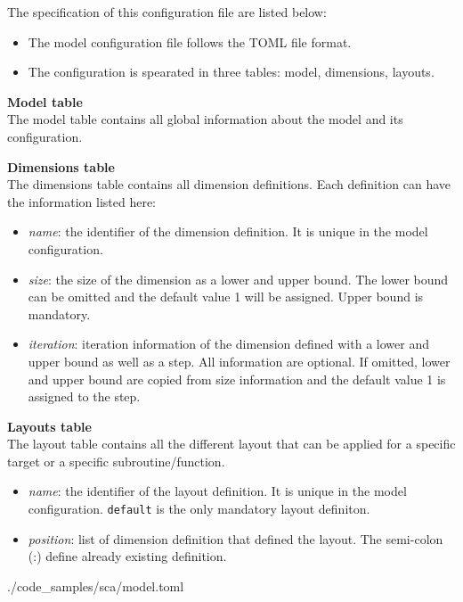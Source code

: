 The specification of this configuration file are listed below:
\begin{itemize}
  \item The model configuration file follows the TOML file format. 
  \item The configuration is spearated in three tables: model, dimensions, 
        layouts.
\end{itemize}

\textbf{Model table}\\
The model table contains all global information about the model and its 
configuration.

\textbf{Dimensions table}\\
The dimensions table contains all dimension definitions. Each definition can 
have the information listed here: 
\begin{itemize}
  \item \textit{name}: the identifier of the dimension definition. It is unique 
        in the model configuration.
  \item \textit{size}: the size of the dimension as a lower and upper bound. 
        The lower bound can be omitted and the default value 1 will be assigned. 
        Upper bound is mandatory.
  \item \textit{iteration}: iteration information of the dimension defined with 
        a lower and upper bound as well as a step. All information are optional. 
        If omitted, lower and upper bound are copied from size information and 
        the default value 1 is assigned to the step.      
\end{itemize}


\textbf{Layouts table}\\
The layout table contains all the different layout that can be applied for a 
specific target or a specific subroutine/function.
\begin{itemize}
  \item \textit{name}: the identifier of the layout definition. It is unique in 
        the model configuration. \lstinline|default| is the only mandatory 
        layout definiton.
  \item \textit{position}: list of dimension definition that defined the layout. 
        The semi-colon (:) define already existing definition.
\end{itemize}


      {./code_samples/sca/model.toml}